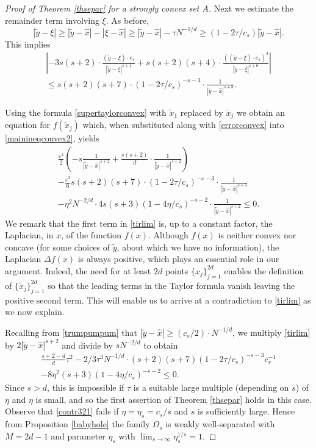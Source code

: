 \documentclass[12pt]{amsart}
\theoremstyle{definition}
\def\ep{\varepsilon}
\newcommand{\1}{\mathbf{1}}
\begin{document}
\begin{proof}[Proof of Theorem \ref{thsepar} for a strongly convex set $A$]
Next we estimate the remainder term involving $\xi$. As before,
$$
|\tilde y-\xi|\geqslant |\tilde y - \hat{x}| - |\xi-\hat{x}|\geqslant |\tilde y - \hat{x}|- \tau N^{-1/d}\geqslant (1-2\tau/c_s)|\tilde y-\hat{x}|.
$$
This implies
\begin{multline}\label{errorconvex}
\left|-3s(s+2)\cdot \frac{(\tilde y-\xi)\cdot e_1}{|\tilde y-\xi|^{s+4}} + s(s+2)(s+4)\cdot \frac{((\tilde y-\xi)\cdot e_1)^3}{|\tilde y-\xi|^{s+6}}\right| \\
 \leqslant s(s+2)(s+7) \cdot (1-2\tau/c_s)^{-s-3}\cdot \frac{1}{|\tilde y-\hat{x}|^{s+3}}.
\end{multline}

Using the formula \eqref{supertaylorconvex} with $\tilde{x}_1$ replaced by $\tilde{x}_j$ we obtain an equation for $f(\tilde{x}_j)$ which, when substituted along with \eqref{errorconvex} into \eqref{mainineqconvex2}, yields
\begin{multline}\label{tirlim}
\frac{\ep^2}2 \left(-s\frac{1}{|\tilde{y}-\hat{x}|^{s+2}}+\frac{s(s+2)}{d}\cdot \frac{1}{|\tilde y-\hat{x}|^{s+2}}\right) \\
-\frac{\ep^3}6 s(s+2)(s+7) \cdot (1-2\tau/c_s)^{-s-3}\cdot \frac{1}{|\tilde y-\hat{x}|^{s+3}}\\ 
-\eta^2 N^{-2/d}\cdot 4s (s+3)(1-4\eta/c_s)^{-s-2}\cdot \frac{1}{|\tilde y-\hat{x}|^{s+2}}\leqslant 0.
\end{multline}
We remark that the first term in \eqref{tirlim} is, up to a constant factor, the Laplacian, in $x$, of the function $f(x)$. Although $f(x)$ is neither convex nor concave (for some choices of $\tilde{y}$, about which we have no information), the Laplacian $\Delta f(x)$ is always positive, which plays an essential role in our argument. Indeed, the need for at least $2d$ points $\{x_j\}_{j=1}^{2d}$ enables the definition of $\{\tilde{x}_j\}_{j=1}^{2d}$ so that the leading terms in the Taylor formula vanish leaving the positive second term. This will enable us to arrive at a contradiction to \eqref{tirlim} as we now explain. 

Recalling from \eqref{trumpumpum} that $|\tilde{y}-\hat{x}|\geqslant (c_s/2)\cdot N^{-1/d}$, we multiply \eqref{tirlim} by $2|\tilde{y}-\hat{x}|^{s+2}$ and divide by $sN^{-2/d}$ to obtain
\begin{multline}\label{contr321}
\frac{s+2-d}d\tau^2-2/3\tau^3 N^{-1/d}\cdot (s+2)(s+7)(1-2\tau/c_s)^{-s-3}c_s^{-1}\\
- 8\eta^2 (s+3)(1-4\eta/c_s)^{-s-2} \leqslant 0.
\end{multline}
Since $s>d$, this is impossible if $\tau$ is a suitable large multiple (depending on $s$) of $\eta$ and $\eta$ is small, and so the first assertion of Theorem \ref{thsepar} holds in this case. Observe that \eqref{contr321} fails if $\eta=\eta_s=c_s/s$ and $s$ is sufficiently large. Hence from Proposition \ref{babyhole} the family $\Omega_s$ is weakly well-separated with $M=2d-1$ and parameter $\eta_s$ with $\lim_{s\to \infty} \eta_s^{1/s}=1$.


\end{proof}
\end{document}
